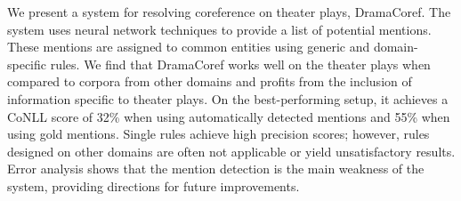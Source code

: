 We present a system for resolving coreference on theater plays, DramaCoref. The system uses neural network techniques to provide a list of potential mentions. These mentions are assigned to common entities using generic and domain-specific rules. We find that DramaCoref works well on the theater plays when compared to corpora from other domains and profits from the inclusion of information specific to theater plays. On the best-performing setup, it achieves a CoNLL score of 32\% when using automatically detected mentions and 55\% when using gold mentions. Single rules achieve high precision scores; however, rules designed on other domains are often not applicable or yield unsatisfactory results. Error analysis shows that the mention detection is the main weakness of the system, providing directions for future improvements.
